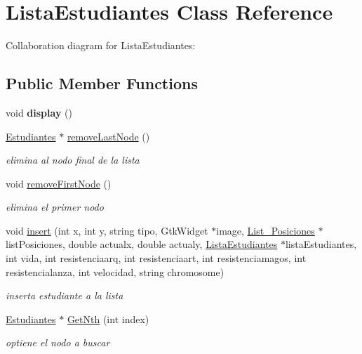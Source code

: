 \hypertarget{classListaEstudiantes}{}\section{Lista\+Estudiantes Class Reference}
\label{classListaEstudiantes}


Collaboration diagram for Lista\+Estudiantes\+:
\subsection*{Public Member Functions}
\begin{DoxyCompactItemize}
\item 
\mbox{\label{classListaEstudiantes_a84e3b2666900e6173149d05940339b67}} 
void {\bfseries display} ()
\item 
\hyperlink{classEstudiantes}{Estudiantes} $\ast$ \hyperlink{classListaEstudiantes_a2fc839804a0e84fe453cf22c662fc5c0}{remove\+Last\+Node} ()
\begin{DoxyCompactList}\small\item\em elimina al nodo final de la lista \end{DoxyCompactList}\item 
void \hyperlink{classListaEstudiantes_a93d5c3df6585cf7d9c7e72280afa1af2}{remove\+First\+Node} ()
\begin{DoxyCompactList}\small\item\em elimina el primer nodo \end{DoxyCompactList}\item 
void \hyperlink{classListaEstudiantes_a1c325ec864441b71d44a990f1d887726}{insert} (int x, int y, string tipo, Gtk\+Widget $\ast$image, \hyperlink{classList__Posiciones}{List\+\_\+\+Posiciones} $\ast$list\+Posiciones, double actualx, double actualy, \hyperlink{classListaEstudiantes}{Lista\+Estudiantes} $\ast$lista\+Estudiantes, int vida, int resistenciaarq, int resistenciaart, int resistenciamagos, int resistencialanza, int velocidad, string chromosome)
\begin{DoxyCompactList}\small\item\em inserta estudiante a la lista \end{DoxyCompactList}\item 
\hyperlink{classEstudiantes}{Estudiantes} $\ast$ \hyperlink{classListaEstudiantes_acc9153be212f34a46849e233716a4e41}{Get\+Nth} (int index)
\begin{DoxyCompactList}\small\item\em optiene el nodo a buscar \end{DoxyCompactList}\item 

\end{DoxyCompactItemize}

